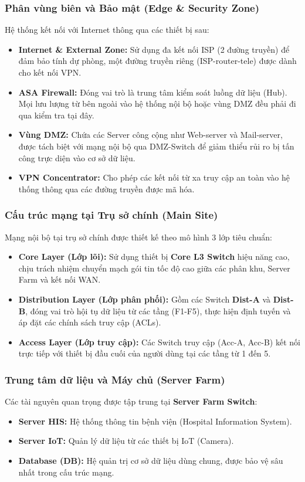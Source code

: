 \subsubsection{Phân vùng biên và Bảo mật (Edge \& Security Zone)}
Hệ thống kết nối với Internet thông qua các thiết bị sau:
\begin{itemize}
    \item \textbf{Internet \& External Zone:} Sử dụng đa kết nối ISP (2 đường truyền) để đảm bảo tính dự phòng, một đường truyền riêng (ISP-router-tele) được dành cho kết nối VPN.
    \item \textbf{ASA Firewall:} Đóng vai trò là trung tâm kiểm soát luồng dữ liệu (Hub). Mọi lưu lượng từ bên ngoài vào hệ thống nội bộ hoặc vùng DMZ đều phải đi qua kiểm tra tại đây.
    \item \textbf{Vùng DMZ:} Chứa các Server công cộng như Web-server và Mail-server, được tách biệt với mạng nội bộ qua DMZ-Switch để giảm thiểu rủi ro bị tấn công trực diện vào cơ sở dữ liệu.
    \item \textbf{VPN Concentrator:} Cho phép các kết nối từ xa truy cập an toàn vào hệ thống thông qua các đường truyền được mã hóa.
\end{itemize}

\subsubsection{Cấu trúc mạng tại Trụ sở chính (Main Site)}
Mạng nội bộ tại trụ sở chính được thiết kế theo mô hình 3 lớp tiêu chuẩn:
\begin{itemize}
    \item \textbf{Core Layer (Lớp lõi):} Sử dụng thiết bị \textbf{Core L3 Switch} hiệu năng cao, chịu trách nhiệm chuyển mạch gói tin tốc độ cao giữa các phân khu, Server Farm và kết nối WAN.
    \item \textbf{Distribution Layer (Lớp phân phối):} Gồm các Switch \textbf{Dist-A} và \textbf{Dist-B}, đóng vai trò hội tụ dữ liệu từ các tầng (F1-F5), thực hiện định tuyến và áp đặt các chính sách truy cập (ACLs).
    \item \textbf{Access Layer (Lớp truy cập):} Các Switch truy cập (Acc-A, Acc-B) kết nối trực tiếp với thiết bị đầu cuối của người dùng tại các tầng từ 1 đến 5.
\end{itemize}

\subsubsection{Trung tâm dữ liệu và Máy chủ (Server Farm)}
Các tài nguyên quan trọng được tập trung tại \textbf{Server Farm Switch}:
\begin{itemize}
    \item \textbf{Server HIS:} Hệ thống thông tin bệnh viện (Hospital Information System).
    \item \textbf{Server IoT:} Quản lý dữ liệu từ các thiết bị IoT (Camera).
    \item \textbf{Database (DB):} Hệ quản trị cơ sở dữ liệu dùng chung, được bảo vệ sâu nhất trong cấu trúc mạng.
\end{itemize}

